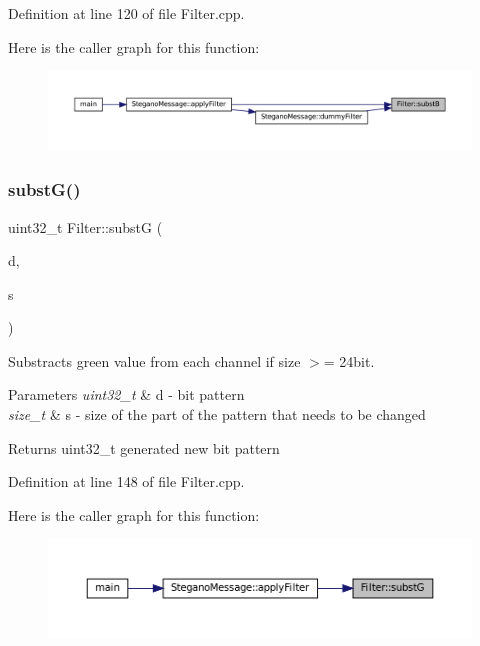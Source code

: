 Definition at line 120 of file Filter.\+cpp.

Here is the caller graph for this function\+:\nopagebreak
\begin{figure}[H]
\begin{center}
\leavevmode
\includegraphics[width=350pt]{classFilter_a3f2bbadc0138195cebf84bd8ce8d9892_icgraph}
\end{center}
\end{figure}
\mbox{\label{classFilter_afc6fee2bd138d157986ef3e2f2907186}} 
\subsubsection{\texorpdfstring{substG()}{substG()}}
{\footnotesize\ttfamily uint32\+\_\+t Filter\+::substG (\begin{DoxyParamCaption}\item[{uint32\+\_\+t}]{d,  }\item[{size\+\_\+t}]{s }\end{DoxyParamCaption})\hspace{0.3cm}{\ttfamily [static]}}



Substracts green value from each channel if size $>$= 24bit. 


\begin{DoxyParams}{Parameters}
{\em uint32\+\_\+t} & d -\/ bit pattern \\
\hline
{\em size\+\_\+t} & s -\/ size of the part of the pattern that needs to be changed \\
\hline
\end{DoxyParams}
\begin{DoxyReturn}{Returns}
uint32\+\_\+t generated new bit pattern 
\end{DoxyReturn}


Definition at line 148 of file Filter.\+cpp.

Here is the caller graph for this function\+:\nopagebreak
\begin{figure}[H]
\begin{center}
\leavevmode
\includegraphics[width=350pt]{classFilter_afc6fee2bd138d157986ef3e2f2907186_icgraph}
\end{center}
\end{figure}
\mbox{\label{classFilter_a773ee633720080079d6a17ac610d353d}} 
